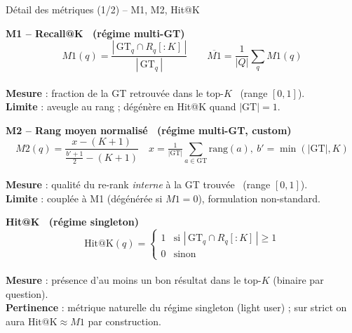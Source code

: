 \documentclass[aspectratio=169,10pt]{beamer}
\begin{document}
\begin{frame}{Détail des métriques (1/2) -- M1, M2, Hit@K}
  \footnotesize

  \textbf{\color{accent}M1 -- Recall@K \ (régime multi-GT)}
  \vspace{-0.2em}
  \[
    M1(q) = \frac{|\,\mathrm{GT}_q \cap R_q[{:}K]\,|}{|\,\mathrm{GT}_q\,|}
    \qquad
    \overline{M1} = \frac{1}{|Q|}\sum_q M1(q)
  \]
  \vspace{-0.6em} \\
  \textbf{Mesure} : fraction de la GT retrouvée dans le top-$K$ \ (range $[0,1]$). \\
  \textbf{Limite} : aveugle au rang ; dégénère en Hit@K quand $|\mathrm{GT}|{=}1$.

  \vspace{0.3em}\hrulefill\vspace{0.2em}

  \textbf{\color{accent}M2 -- Rang moyen normalisé \ (régime multi-GT, custom)}
  \vspace{-0.2em}
  \[
    M2(q) = \frac{x - (K{+}1)}{\frac{b'+1}{2} - (K{+}1)}
    \quad
    x = \tfrac{1}{|\mathrm{GT}|}\!\!\sum_{a\in\mathrm{GT}}\!\!\mathrm{rang}(a),\
    b' = \min(|\mathrm{GT}|, K)
  \]
  \vspace{-0.6em} \\
  \textbf{Mesure} : qualité du re-rank \emph{interne} à la GT trouvée \ (range $[0,1]$). \\
  \textbf{Limite} : couplée à M1 (dégénérée si $M1{=}0$), formulation non-standard.

  \vspace{0.3em}\hrulefill\vspace{0.2em}

  \textbf{\color{ok}Hit@K \ (régime singleton)}
  \vspace{-0.2em}
  \[
    \mathrm{Hit@K}(q) =
    \begin{cases}
      1 & \text{si } |\,\mathrm{GT}_q \cap R_q[{:}K]\,| \ge 1 \\
      0 & \text{sinon}
    \end{cases}
  \]
  \vspace{-0.6em} \\
  \textbf{Mesure} : présence d'au moins un bon résultat dans le top-$K$ (binaire par question). \\
  \textbf{Pertinence} : métrique naturelle du régime singleton (light user) ; sur strict on aura $\mathrm{Hit@K} \approx M1$ par construction.
\end{frame}
\end{document}
